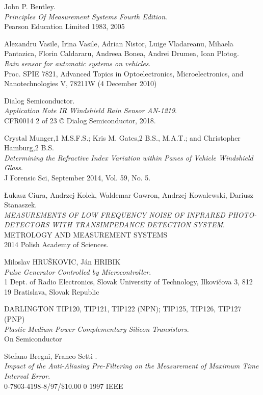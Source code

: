 \documentclass[conference, 11pt]{IEEEtran}
\begin{document}
\begin{thebibliography}{22}


John P. Bentley. \\
\textit{Principles Of Measurement Systems Fourth Edition}. \\
Pearson Education Limited 1983, 2005



Alexandru Vasile, Irina Vasile, Adrian Nistor, Luige Vladareanu, Mihaela Pantazica, Florin Caldararu, Andreea Bonea, Andrei Drumea, Ioan Plotog.\\
\textit{Rain sensor for automatic systems on vehicles}. \\
Proc. SPIE 7821, Advanced Topics in Optoelectronics, Microelectronics, and Nanotechnologies V, 78211W (4 December 2010)

Dialog Semiconductor. \\
\textit{Application Note IR Windshield Rain Sensor AN-1219}. \\
CFR0014 2 of 23 © Dialog Semiconductor, 2018.


Crystal Munger,1 M.S.F.S.; Kris M. Gates,2 B.S., M.A.T.; and Christopher Hamburg,2 B.S. \\
\textit{Determining the Refractive Index Variation within Panes of Vehicle Windshield Glass}. \\
J Forensic Sci, September 2014, Vol. 59, No. 5.



Łukasz Ciura, Andrzej Kolek, Waldemar Gawron, Andrzej Kowalewski, Dariusz Stanaszek.\\
\textit{MEASUREMENTS OF LOW FREQUENCY NOISE OF INFRARED PHOTO- DETECTORS WITH TRANSIMPEDANCE DETECTION SYSTEM}. \\
METROLOGY AND MEASUREMENT SYSTEMS\\
2014 Polish Academy of Sciences.



Miloslav HRUŠKOVIC, Ján HRIBIK \\
\textit{Pulse Generator Controlled by Microcontroller}. \\
1 Dept. of Radio Electronics, Slovak University of Technology, Ilkovičova 3, 812 19 Bratislava, Slovak Republic


DARLINGTON TIP120, TIP121, TIP122 (NPN); TIP125, TIP126, TIP127 (PNP)\\
\textit{Plastic Medium-Power Complementary Silicon Transistors}. \\
On Semiconductor


Stefano Bregni, Franco Setti .\\
\textit{Impact of the Anti-Aliasing Pre-Filtering on the Measurement of Maximum Time Interval Error}. \\
0-7803-4198-8/97/\$10.00 0 1997 IEEE





\end{thebibliography}
\end{document}
